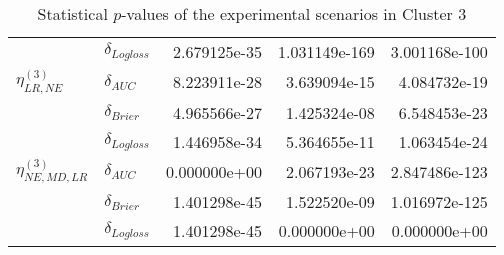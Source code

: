 \begin{table}[!h]
\begin{tabular}{l|lrrr}
                              & $\delta_{Logloss}$ &           2.679125e-35 &    1.031149e-169 &            3.001168e-100 \\
    $\eta^{(3)}_{LR, NE}$ & $\delta_{AUC}$ &           8.223911e-28 &     3.639094e-15 &             4.084732e-19 \\
                              & $\delta_{Brier}$ &           4.965566e-27 &     1.425324e-08 &             6.548453e-23 \\
                              & $\delta_{Logloss}$ &           1.446958e-34 &     5.364655e-11 &             1.063454e-24 \\
    $\eta^{(3)}_{NE, MD, LR}$ & $\delta_{AUC}$ &           0.000000e+00 &     2.067193e-23 &            2.847486e-123 \\
                              & $\delta_{Brier}$ &           1.401298e-45 &     1.522520e-09 &            1.016972e-125 \\
                              & $\delta_{Logloss}$ &           1.401298e-45 &     0.000000e+00 &             0.000000e+00 \\
    \bottomrule
    \end{tabular}
    \caption{Statistical $p$-values of the experimental scenarios in Cluster 3}
    \end{table}
    
